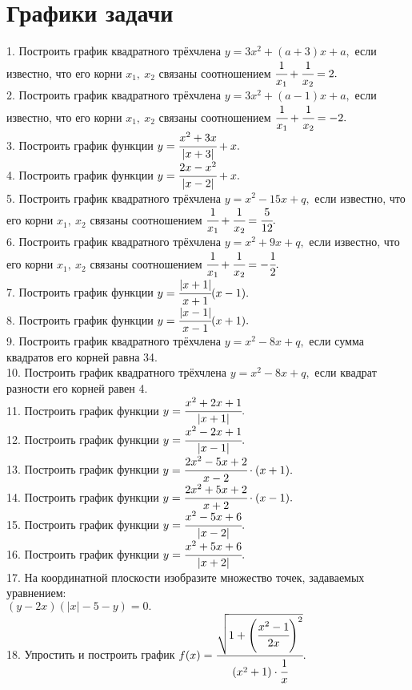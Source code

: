 \section{Графики задачи}
1. Построить график квадратного трёхчлена $y=3x^2+(a+3)x+a,$ если известно,
что его корни $x_1,\ x_2$ связаны соотношением $\cfrac{1}{x_1}+\cfrac{1}{x_2}=2.$\\
2. Построить график квадратного трёхчлена $y=3x^2+(a-1)x+a,$ если известно,
что его корни $x_1,\ x_2$ связаны соотношением $\cfrac{1}{x_1}+\cfrac{1}{x_2}=-2.$\\
3. Построить график функции $y=\cfrac{x^2+3x}{|x+3|}+x.$\\
4. Построить график функции $y=\cfrac{2x-x^2}{|x-2|}+x.$\\
5. Построить график квадратного трёхчлена $y=x^2-15x+q,$ если известно,
что его корни $x_1,\ x_2$ связаны соотношением $\cfrac{1}{x_1}+\cfrac{1}{x_2}=\cfrac{5}{12}.$\\
6. Построить график квадратного трёхчлена $y=x^2+9x+q,$ если известно,
что его корни $x_1,\ x_2$ связаны соотношением $\cfrac{1}{x_1}+\cfrac{1}{x_2}=-\cfrac{1}{2}.$\\
7. Построить график функции $y=\cfrac{|x+1|}{x+1}(x-1).$\\
8. Построить график функции $y=\cfrac{|x-1|}{x-1}(x+1).$\\
9. Построить график квадратного трёхчлена $y=x^2-8x+q,$ если сумма квадратов его корней равна 34.\\
10. Построить график квадратного трёхчлена $y=x^2-8x+q,$ если квадрат разности его корней равен 4.\\
11. Построить график функции $y=\cfrac{x^2+2x+1}{|x+1|}.$\\
12. Построить график функции $y=\cfrac{x^2-2x+1}{|x-1|}.$\\
13. Построить график функции $y=\cfrac{2x^2-5x+2}{x-2}\cdot(x+1).$\\
14. Построить график функции $y=\cfrac{2x^2+5x+2}{x+2}\cdot(x-1).$\\
15. Построить график функции $y=\cfrac{x^2-5x+6}{|x-2|}.$\\
16. Построить график функции $y=\cfrac{x^2+5x+6}{|x+2|}.$\\
17. На координатной плоскости изобразите множество точек, задаваемых уравнением:\\ $(y-2x)\left(|x|-5-y\right)=0.$\\
18. Упростить и построить график $f(x)=\cfrac{\sqrt{1+\left(\cfrac{x^2-1}{2x}\right)^2}}{(x^2+1)\cdot\cfrac{1}{x}}.$\\
